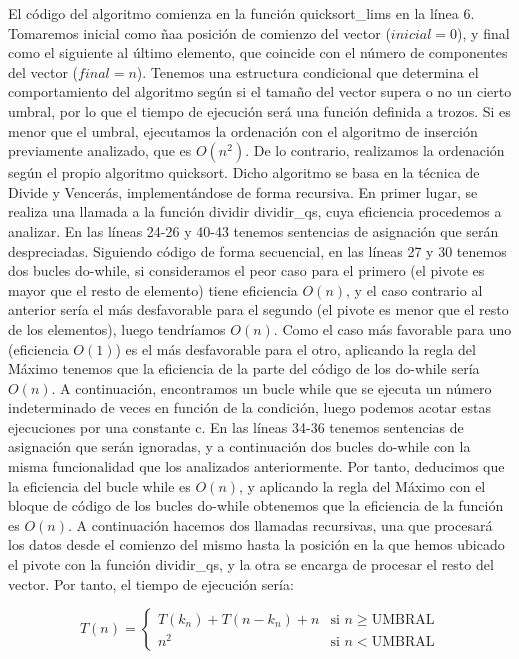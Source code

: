 \documentclass{homework}
\begin{document}
    El código del algoritmo comienza en la función quicksort\_lims en la línea 6. Tomaremos inicial 
    como ñaa posición de comienzo del vector ($inicial = 0$), y final como el siguiente al último elemento, 
    que coincide con el número de componentes del vector ($final = n$).
    Tenemos una estructura condicional que determina el comportamiento del algoritmo según si el tamaño del vector 
    supera o no un cierto umbral, por lo que el tiempo de ejecución será una función definida a trozos. Si es menor 
    que el umbral, ejecutamos la ordenación con el algoritmo de inserción previamente analizado, que es $O(n^2)$. De lo
    contrario, realizamos la ordenación según el propio algoritmo quicksort. Dicho algoritmo se basa en la técnica de Divide
    y Vencerás, implementándose de forma recursiva. En primer lugar, se realiza una llamada a la función dividir dividir\_qs, 
    cuya eficiencia procedemos a analizar. En las líneas 24-26 y 40-43 tenemos sentencias de asignación que serán despreciadas. 
    Siguiendo código de forma secuencial, en las líneas 27 y 30 tenemos dos bucles do-while, si consideramos el peor caso para 
    el primero (el pivote es mayor que el resto de elemento) tiene eficiencia $O(n)$, y el caso contrario al anterior sería el 
    más desfavorable para el segundo (el pivote es menor que el resto de los elementos), luego tendríamos $O(n)$. Como el caso más 
    favorable para uno (eficiencia $O(1)$) es el más desfavorable para el otro, aplicando la regla del Máximo tenemos que la 
    eficiencia de la parte del código de los do-while sería $O(n)$.  A continuación, encontramos un bucle while que se ejecuta un 
    número indeterminado de veces en función de la condición, luego podemos acotar estas ejecuciones por una constante c. En las 
    líneas 34-36 tenemos sentencias de asignación que serán ignoradas, y a continuación dos bucles do-while con la misma funcionalidad
    que los analizados anteriormente. Por tanto, deducimos que la eficiencia del bucle while es $O(n)$, y aplicando la regla del 
    Máximo con el bloque de código de los bucles do-while obtenemos que la eficiencia de la función es $O(n)$. A continuación hacemos dos llamadas
    recursivas, una que procesará los datos desde el comienzo del mismo hasta la posición en la que hemos ubicado el pivote con la 
    función dividir\_qs, y la otra se encarga de procesar el resto del vector. Por tanto, el tiempo de ejecución sería:

    \begin{equation}
        T(n) = \left\{ \begin{array}{lr} T(k_n) + T(n-k_n) + n & \text{si } n \geq \text{UMBRAL}\\ n^2 & \text{si } n < \text{UMBRAL} \end{array} \right.
    \end{equation}
\end{document}
